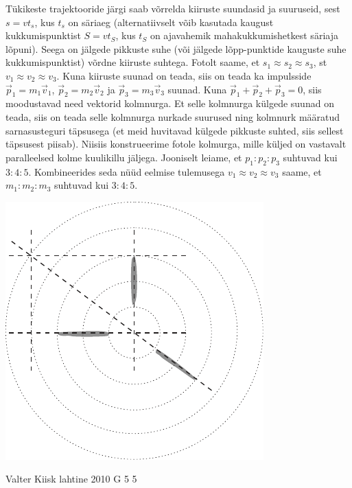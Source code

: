 \documentclass[11pt, twoside]{article}
\begin{document}
{{\ifSolution
Tükikeste trajektooride järgi saab võrrelda kiiruste suundasid ja suuruseid, sest $s = vt_s$, kus $t_s$ on säriaeg (alternatiivselt võib kasutada kaugust kukkumispunktist $S = vt_S$, kus $t_S$ on ajavahemik mahakukkumishetkest säriaja lõpuni). Seega on jälgede pikkuste suhe (või jälgede lõpp-punktide kauguste suhe kukkumispunktist) võrdne kiiruste suhtega. Fotolt saame, et $s_1 \approx s_2 \approx s_3$, st $v_1 \approx v_2 \approx v_3$. Kuna kiiruste suunad on teada, siis on teada ka impulsside $\vec p_1 = m_1\vec v_1$, $\vec p_2 = m_2\vec v_2$ ja $\vec p_3 = m_3\vec v_3$ suunad. Kuna $\vec p_1 + \vec p_2 + \vec p_3 = 0$, siis moodustavad need vektorid kolmnurga. Et selle kolmnurga külgede suunad on teada, siis on teada selle kolmnurga nurkade suurused ning kolmnurk määratud sarnasusteguri täpsusega (et meid huvitavad külgede pikkuste suhted, siis sellest täpsusest piisab). Niisiis konstrueerime fotole kolmurga, mille küljed on vastavalt paralleelsed kolme kuulikillu jäljega. Jooniselt leiame, et $p_1 : p_2 : p_3$ suhtuvad kui $3 : 4 : 5$. Kombineerides seda nüüd eelmise tulemusega $v_1 \approx v_2 \approx v_3$ saame, et $m_1 : m_2 : m_3$ suhtuvad kui $3 : 4 : 5$.
\begin{center}
	\includegraphics[width=0.6\linewidth]{2008-v2g-06-lah}
\end{center}
\fi
}

{Valter Kiisk} %
{lahtine} %
{2010} %
{G 5} %
{5} %
{

}}
\end{document}
